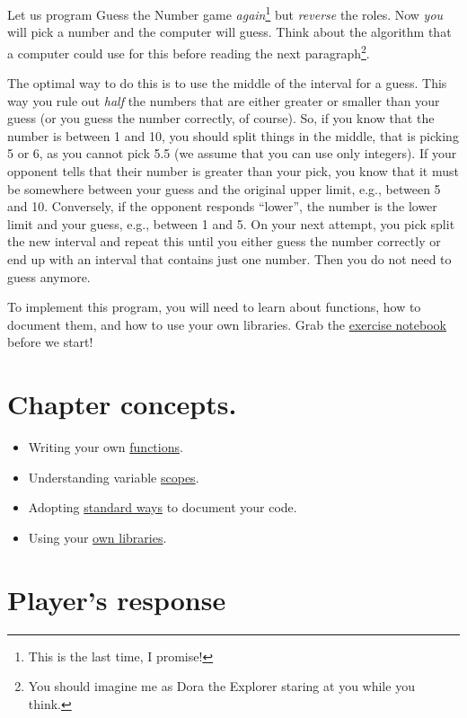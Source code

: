 \documentclass[
]{book}
\providecommand{\tightlist}{%
  \setlength{\itemsep}{0pt}\setlength{\parskip}{0pt}}
\begin{document}
Let us program Guess the Number game \emph{again}\footnote{This is the last time, I promise!} but \emph{reverse} the roles. Now \emph{you} will pick a number and the computer will guess. Think about the algorithm that a computer could use for this before reading the next paragraph\footnote{You should imagine me as Dora the Explorer staring at you while you think.}.

The optimal way to do this is to use the middle of the interval for a guess. This way you rule out \emph{half} the numbers that are either greater or smaller than your guess (or you guess the number correctly, of course). So, if you know that the number is between 1 and 10, you should split things in the middle, that is picking 5 or 6, as you cannot pick 5.5 (we assume that you can use only integers). If your opponent tells that their number is greater than your pick, you know that it must be somewhere between your guess and the original upper limit, e.g., between 5 and 10. Conversely, if the opponent responds ``lower'', the number is the lower limit and your guess, e.g., between 1 and 5. On your next attempt, you pick split the new interval and repeat this until you either guess the number correctly or end up with an interval that contains just one number. Then you do not need to guess anymore.

To implement this program, you will need to learn about functions, how to document them, and how to use your own libraries. Grab the \href{notebooks/Guess\%20the\%20number\%20-\%20AI.ipynb}{exercise notebook} before we start!

\hypertarget{chapter-concepts.}{%
\section{Chapter concepts.}\label{chapter-concepts.}}

\begin{itemize}
\tightlist
\item
  Writing your own \protect\hyperlink{function}{functions}.
\item
  Understanding variable \protect\hyperlink{scopes-for-immutable-values}{scopes}.
\item
  Adopting \protect\hyperlink{numpy-docstring}{standard ways} to document your code.
\item
  Using your \protect\hyperlink{using-you-own-libraries}{own libraries}.
\end{itemize}

\hypertarget{guess-the-number-players-response}{%
\section{Player's response}\label{guess-the-number-players-response}}
\end{document}

